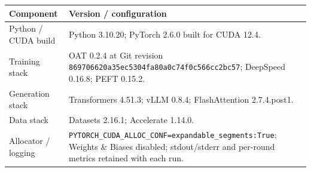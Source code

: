 \begin{center}
\begin{minipage}{\linewidth}
\centering
{}
\label{tab:exp3-runtime}
\scriptsize
\setlength{\tabcolsep}{3pt}
\begin{tabular}{p{.29\linewidth}p{.66\linewidth}}
\toprule
\textbf{Component} & \textbf{Version / configuration} \\
\midrule
Python / CUDA build & Python 3.10.20; PyTorch 2.6.0 built for CUDA 12.4. \\
Training stack & OAT 0.2.4 at Git revision
\texttt{869706620a35ec5304fa80a0\allowbreak{}c74f0c566cc2bc57}; DeepSpeed 0.16.8; PEFT 0.15.2. \\
Generation stack & Transformers 4.51.3; vLLM 0.8.4; FlashAttention 2.7.4.post1. \\
Data stack & Datasets 2.16.1; Accelerate 1.14.0. \\
Allocator / logging & \texttt{PYTORCH\_CUDA\_ALLOC\_CONF=expandable\_segments:True};
Weights \& Biases disabled; stdout/stderr and per-round metrics retained with each
run. \\
\bottomrule
\end{tabular}
\end{minipage}
\end{center}
